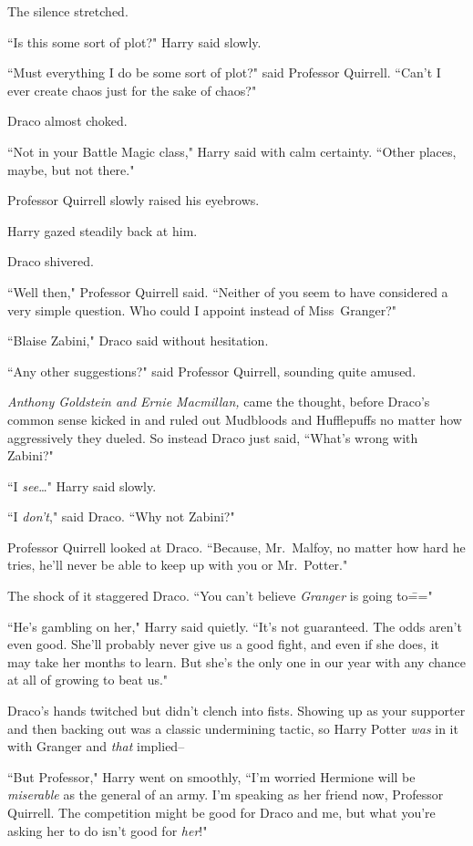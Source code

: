 The silence stretched.

``Is this some sort of plot?" Harry said slowly.

``Must everything I do be some sort of plot?" said Professor Quirrell. ``Can't I ever create chaos just for the sake of chaos?"

Draco almost choked.

``Not in your Battle Magic class," Harry said with calm certainty. ``Other places, maybe, but not there."

Professor Quirrell slowly raised his eyebrows.

Harry gazed steadily back at him.

Draco shivered.

``Well then," Professor Quirrell said. ``Neither of you seem to have considered a very simple question. Who could I appoint instead of Miss~Granger?"

``Blaise Zabini," Draco said without hesitation.

``Any other suggestions?" said Professor Quirrell, sounding quite amused.

\emph{Anthony Goldstein and Ernie Macmillan,} came the thought, before Draco's common sense kicked in and ruled out Mudbloods and Hufflepuffs no matter how aggressively they dueled. So instead Draco just said, ``What's wrong with Zabini?"

``I \emph{see}{\ldots}" Harry said slowly.

``I \emph{don't}," said Draco. ``Why not Zabini?"

Professor Quirrell looked at Draco. ``Because, Mr.~Malfoy, no matter how hard he tries, he'll never be able to keep up with you or Mr.~Potter."

The shock of it staggered Draco. ``You can't believe \emph{Granger} is going to\==="

``He's gambling on her," Harry said quietly. ``It's not guaranteed. The odds aren't even good. She'll probably never give us a good fight, and even if she does, it may take her months to learn. But she's the only one in our year with any chance at all of growing to beat us."

Draco's hands twitched but didn't clench into fists. Showing up as your supporter and then backing out was a classic undermining tactic, so Harry Potter \emph{was} in it with Granger and \emph{that} implied\---

``But Professor," Harry went on smoothly, ``I'm worried Hermione will be \emph{miserable} as the general of an army. I'm speaking as her friend now, Professor Quirrell. The competition might be good for Draco and me, but what you're asking her to do isn't good for \emph{her}!"

